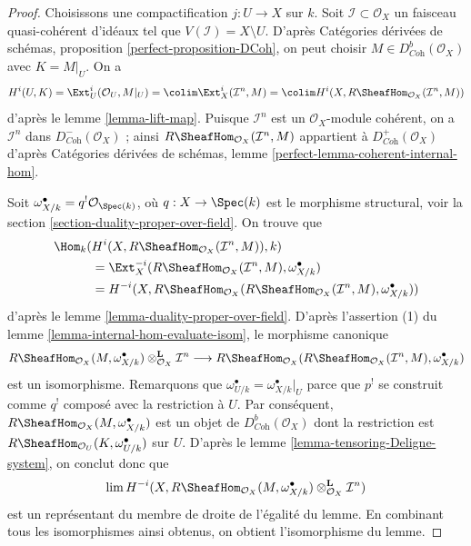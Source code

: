 \begin{proof}
Choisissons une compactification $j : U \to X$ sur $k$. Soit $\mathcal{I} \subset \mathcal{O}_X$ un faisceau quasi-cohérent d'idéaux tel que $V(\mathcal{I}) = X \setminus U$. D'après Catégories dérivées de schémas, proposition \ref{perfect-proposition-DCoh}, on peut choisir $M \in D^b_{\textit{Coh}}(\mathcal{O}_X)$ avec $K = M|_U$. On a
\begingroup\small
$$
H^i(U, K) =
\Ext^i_U(\mathcal{O}_U, M|_U) =
\colim \Ext^i_X(\mathcal{I}^n, M) =
\colim H^i(X, R\SheafHom_{\mathcal{O}_X}(\mathcal{I}^n, M))
$$
\endgroup
d'après le lemme \ref{lemma-lift-map}. Puisque $\mathcal{I}^n$ est un $\mathcal{O}_X$-module cohérent, on a $\mathcal{I}^n$ dans $D^-_{\textit{Coh}}(\mathcal{O}_X)$ ; ainsi $R\SheafHom_{\mathcal{O}_X}(\mathcal{I}^n, M)$ appartient à $D^+_{\textit{Coh}}(\mathcal{O}_X)$ d'après Catégories dérivées de schémas, lemme \ref{perfect-lemma-coherent-internal-hom}.

\medskip\noindent
Soit $\omega_{X/k}^\bullet = q^!\mathcal{O}_{\Spec(k)}$, où $q : X \to \Spec(k)$ est le morphisme structural, voir la section \ref{section-duality-proper-over-field}. On trouve que
\begin{align*}
\Hom_k(
&
H^i(X, R\SheafHom_{\mathcal{O}_X}(\mathcal{I}^n, M)), k) \\
& =
\Ext^{-i}_X(R\SheafHom_{\mathcal{O}_X}(\mathcal{I}^n, M),
\omega_{X/k}^\bullet) \\
& =
H^{-i}(X, R\SheafHom_{\mathcal{O}_X}(R\SheafHom_{\mathcal{O}_X}(
\mathcal{I}^n, M), \omega_{X/k}^\bullet))
\end{align*}
d'après le lemme \ref{lemma-duality-proper-over-field}. D'après l'assertion (1) du lemme \ref{lemma-internal-hom-evaluate-isom}, le morphisme canonique
$$
R\SheafHom_{\mathcal{O}_X}(M, \omega_{X/k}^\bullet)
\otimes_{\mathcal{O}_X}^\mathbf{L} \mathcal{I}^n
\longrightarrow
R\SheafHom_{\mathcal{O}_X}(R\SheafHom_{\mathcal{O}_X}(
\mathcal{I}^n, M), \omega_{X/k}^\bullet)
$$
est un isomorphisme. Remarquons que
$\omega^\bullet_{U/k} = \omega^\bullet_{X/k}|_U$
parce que $p^!$ se construit comme $q^!$ composé avec la restriction à $U$. Par conséquent, $R\SheafHom_{\mathcal{O}_X}(M, \omega_{X/k}^\bullet)$ est un objet de $D^b_{\textit{Coh}}(\mathcal{O}_X)$ dont la restriction est $R\SheafHom_{\mathcal{O}_U}(K, \omega_{U/k}^\bullet)$ sur $U$. D'après le lemme \ref{lemma-tensoring-Deligne-system}, on conclut donc que
$$
\lim H^{-i}(X, R\SheafHom_{\mathcal{O}_X}(M, \omega_{X/k}^\bullet)
\otimes_{\mathcal{O}_X}^\mathbf{L} \mathcal{I}^n)
$$
est un représentant du membre de droite de l'égalité du lemme. En combinant tous les isomorphismes ainsi obtenus, on obtient l'isomorphisme du lemme.
\end{proof}

